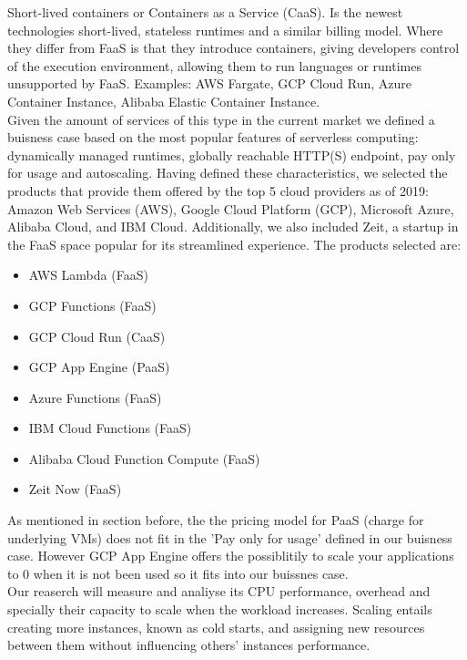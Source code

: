 \documentclass[11pt]{article}
\begin{document}
Short-lived containers or Containers as a Service (CaaS). Is the newest technologies short-lived, stateless runtimes and a similar billing model. Where they differ from FaaS is that they introduce containers, giving developers control of the execution environment, allowing them to run languages or runtimes unsupported by FaaS. Examples: AWS Fargate, GCP Cloud Run, Azure Container Instance, Alibaba Elastic Container Instance. \\

Given the amount of services of this type in the current market we defined a buisness case based on the most popular features \cite{popular1} of serverless computing: dynamically managed runtimes, globally reachable HTTP(S) endpoint, pay only for usage and autoscaling. Having defined these characteristics, we selected the products that provide them offered by the top 5 cloud providers as of 2019: Amazon Web Services (AWS), Google Cloud Platform (GCP), Microsoft Azure, Alibaba Cloud, and IBM Cloud. Additionally, we also included Zeit, a startup in the FaaS space popular for its streamlined experience. The products selected are:

\begin{multicols}{2}
\begin{itemize}
\item AWS Lambda (FaaS)
\item GCP Functions (FaaS)
\item GCP Cloud Run (CaaS)
\item GCP App Engine (PaaS)
\item Azure Functions (FaaS)
\item IBM Cloud Functions (FaaS)
\item Alibaba Cloud Function Compute (FaaS)
\item Zeit Now (FaaS) 
\end{itemize}
\end{multicols}

As mentioned in section before, the the pricing model for PaaS (charge for underlying VMs) does not fit in the 'Pay only for usage' defined in our buisness case. However GCP App Engine offers the possiblitily to scale your applications to 0 when it is not been used so it fits into our buissnes case. \\

Our reaserch will measure and analiyse its CPU performance, overhead and specially their capacity to scale when the workload increases. Scaling entails creating more instances, known as cold starts, and assigning new resources between them without influencing others' instances performance. 
\end{document}
